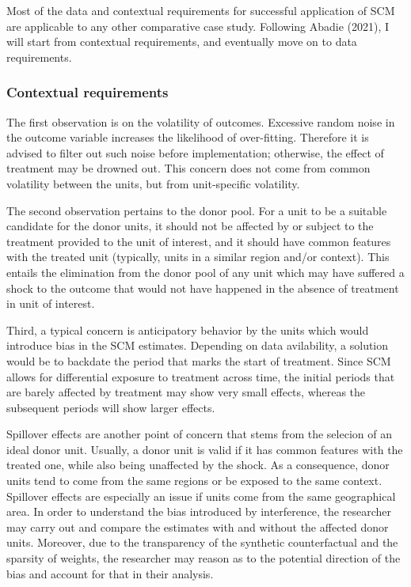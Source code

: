 \documentclass[12pt,a4paper,draft]{article}
\begin{document}
Most of the data and contextual requirements for successful application of 
SCM are applicable to any other comparative case study. Following Abadie (2021), I 
will start from contextual requirements, and eventually move on to data requirements.


\subsubsection{Contextual requirements}

The first observation is on the volatility of outcomes. Excessive random noise in the 
outcome variable increases the likelihood of over-fitting. Therefore it is advised to 
filter out such noise before implementation; otherwise, the effect of treatment 
may be drowned out. This concern does not come from common volatility between the 
units, but from unit-specific volatility.

The second observation pertains to the donor pool. For a unit to be a suitable 
candidate for the donor units, it should not be affected by or subject to the 
treatment provided to the unit of interest, and it should have common features 
with the treated unit (typically, units in a similar region and/or context). 
This entails the elimination from the 
donor pool of any unit which may have suffered a shock to the outcome that would 
not have happened in the absence of treatment in unit of interest.


Third, a typical concern is anticipatory behavior by the units which would 
introduce bias in the SCM estimates. Depending on data avilability, a solution 
would be to backdate the period that marks the start of treatment. Since SCM allows 
for differential exposure to treatment across time, the initial periods that 
are barely affected by treatment may show very small effects, whereas the subsequent 
periods will show larger effects.

Spillover effects are another point of concern that stems from the selecion of 
an ideal donor unit. Usually, a donor unit is valid if it has common features 
with the treated one, while also being unaffected by the shock. As a consequence, 
donor units tend to come from the same regions or be exposed to the same 
context. Spillover effects are especially an issue if units come from the same 
geographical area. In order to understand the bias introduced by interference, 
the researcher may carry out and compare the estimates with and without the 
affected donor units. Moreover, due to the transparency of the synthetic 
counterfactual and the sparsity of weights, the researcher may reason as to the 
potential direction of the bias and account for that in their analysis.
\end{document}
